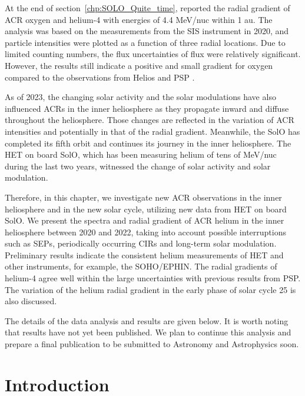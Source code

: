At the end of section~\ref{chp:SOLO_Quite_time}, \citet{Mason-2021-SolOQuietTime} reported the radial gradient of \ac{ACR} oxygen and helium-4 with energies of 4.4 MeV/nuc within 1 au. The analysis was based on the measurements from the \ac{SIS} instrument in 2020, and particle intensities were plotted as a function of three radial locations. Due to limited counting numbers, the flux uncertainties of flux were relatively significant. However, the results still indicate a positive and small gradient for oxygen compared to the observations from Helios and \ac{PSP} \citep{Marquardt2018AA,Rankin2021ApJ}.

As of 2023, the changing solar activity and the solar modulations have also influenced \acp{ACR} in the inner heliosphere as they propagate inward and diffuse throughout the heliosphere. Those changes are reflected in the variation of \ac{ACR} intensities and potentially in that of the radial gradient.
Meanwhile, the \ac{SolO} has completed its fifth orbit and continues its journey in the inner heliosphere. The \ac{HET} on board \ac{SolO}, which has been measuring helium of tens of MeV/nuc during the last two years, witnessed the change of solar activity and solar modulation.

Therefore, in this chapter, we investigate new \ac{ACR} observations in the inner heliosphere and in the new solar cycle, utilizing new data from \ac{HET} on board \ac{SolO}. We present the spectra and radial gradient of \ac{ACR} helium in the inner heliosphere between 2020 and 2022, taking into account possible interruptions such as \acp{SEP}, periodically occurring \acp{CIR} and long-term solar modulation.
Preliminary results indicate the consistent helium measurements of \ac{HET} and other instruments, for example, the \ac{SOHO}/\ac{EPHIN}. The radial gradients of helium-4 agree well within the large uncertainties with previous results from \ac{PSP}. The variation of the helium radial gradient in the early phase of solar cycle 25 is also discussed.

The details of the data analysis and results are given below. It is worth noting that results have not yet been published. We plan to continue this analysis and prepare a final publication to be submitted to Astronomy and Astrophysics soon.


\section{Introduction}

